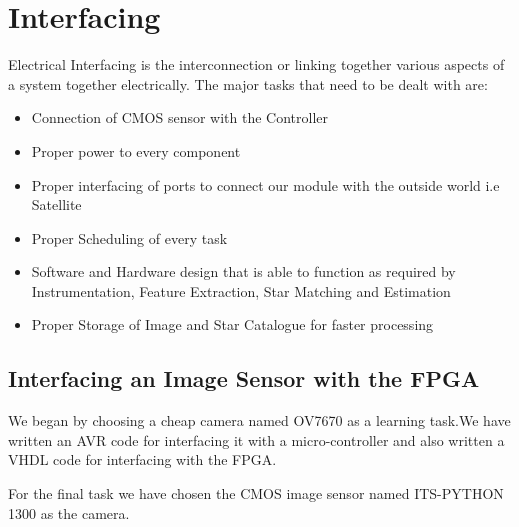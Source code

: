 \documentclass[../../main.tex]{subfiles}
\begin{document}
\section{Interfacing}
\thispagestyle{fancy}











Electrical Interfacing is the interconnection or linking together various aspects of a system together electrically. The major tasks that need to be dealt with are:

\begin{itemize}
    \item {Connection of CMOS sensor with the Controller}
    \item {Proper power to every component}
    \item {Proper interfacing of ports to connect our module with the outside world i.e Satellite}
    \item {Proper Scheduling of every task}
    \item {Software and Hardware design that is able to function as required by Instrumentation, Feature Extraction, Star Matching and Estimation}
    \item {Proper Storage of Image and Star Catalogue for faster processing}
\end{itemize}


\subsection{Interfacing an Image Sensor with the FPGA}
We began by choosing a cheap camera named OV7670 as a learning task.We have written an AVR code for interfacing it with a micro-controller and also written a VHDL code for interfacing with the FPGA.

For the final task we have chosen the CMOS image sensor named ITS-PYTHON 1300 as the camera.
\end{document}

